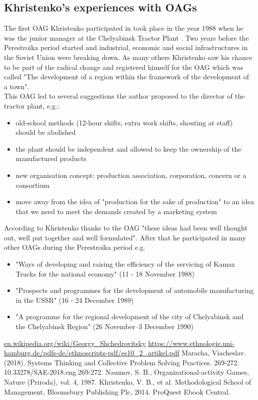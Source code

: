 \documentclass[11pt]{article}
\begin{document}
\subsection{Khristenko's experiences with OAGs}
The first OAG Khristenko participated in took place in the year 1988 when he was the junior manager at the Chelyabinsk Tractor Plant  \cite[p. 38 et seqq.]{5}. Two years before the Perestroika period started and industrial, economic and social infrastructures in the Soviet Union were breaking down. As many others Khristenko saw his chance to be part of the radical change and registered himself for the OAG which was called "The development of a region within the framework of the development of a town".\\
This OAG led to several suggestions the author proposed to the director of the tractor plant, e.g.:
\begin{itemize}
	\setlength\itemsep{0em}
	\item old-school methods (12-hour shifts, extra work shifts, shouting at staff) should be abolished
	\item the plant should be independent and allowed to keep the ownership of the manufactured products
	\item new organisation concept: production association, corporation, concern or a consortium
	\item move away from the idea of "production for the sake of production" to an idea that we need to meet the demands created by a marketing system
\end{itemize}
According to Khristenko thanks to the OAG "these ideas had been well thought out, well put together and well formulated". After that he participated in many other OAGs during the Perestroika period e.g.
\begin{itemize}
	\setlength\itemsep{0em}
	\item "Ways of developing and raising the efficiency of the servicing of Kamaz Trucks for the national economy" (11 - 18 November 1988)
	\item "Prospects and programmes for the development of automobile manufacturing in the USSR" (16 - 24 December 1989)
	\item "A programme for the regional development of the city of Chelyabinsk and the Chelyabinsk Region" (26 November–3 December 1990)
\end{itemize}

	
\begin{thebibliography}{99}
  \url{en.wikipedia.org/wiki/Georgy_Shchedrovitsky}
  \url{https://www.ethnologie.uni-hamburg.de/pdfs-de/ethnoscripts-pdf/es10_2_artikel.pdf}
  Maracha, Viacheslav. (2018). Systems Thinking and Collective Problem Solving Practices. 269-272. 10.33278/SAE-2018.eng.269-272. 
  Naumov, S. B., Organizational-activity Games, Nature (Priroda), vol. 4, 1987.
  Khristenko, V. B., et al. Methodological School of Management, Bloomsbury Publishing Plc, 2014. ProQuest Ebook Central.
\end{thebibliography}
\end{document}
